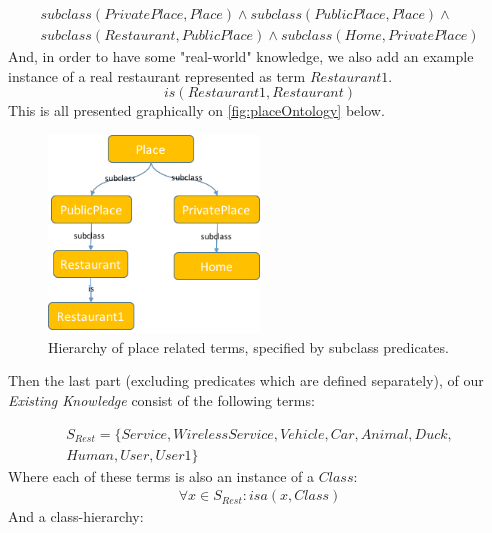 \begin{equation}\label{as:kbPlaceSubclasses}
\begin{gathered}
    subclass(PrivatePlace,Place) \land subclass(PublicPlace,Place) \land \\
	subclass(Restaurant,PublicPlace) \land subclass(Home,PrivatePlace)
\end{gathered}
\end{equation}
And, in order to have some "real-world" knowledge, we also add an example 
instance of a real restaurant represented as term $Restaurant1$.
\begin{equation}\label{as:restaurant1}
	is(Restaurant1,Restaurant)
\end{equation}
This is all presented graphically on \autoref{fig:placeOntology} below.
\begin{figure}[H]
	\centering
		\includegraphics[width=0.5\textwidth]{figures/placeOntology.png}
	\caption{Hierarchy of place related terms, specified by subclass predicates.}
	\label{fig:placeOntology}
\end{figure}

Then the last part (excluding predicates which are defined separately),
of our \emph{Existing Knowledge} consist of the following terms:

\begin{equation}\label{set:otherTerms}
\begin{gathered}
S_{Rest} = \{Service,WirelessService,Vehicle,Car,Animal,Duck,\\
	Human,User,User1\}
\end{gathered}
\end{equation}
Where each of these terms is also an instance of a $Class$:
\begin{equation}\label{set:restTermsClass}
\begin{gathered}
\forall x \in S_{Rest}: isa(x,Class)
\end{gathered}
\end{equation}
And a class-hierarchy:

